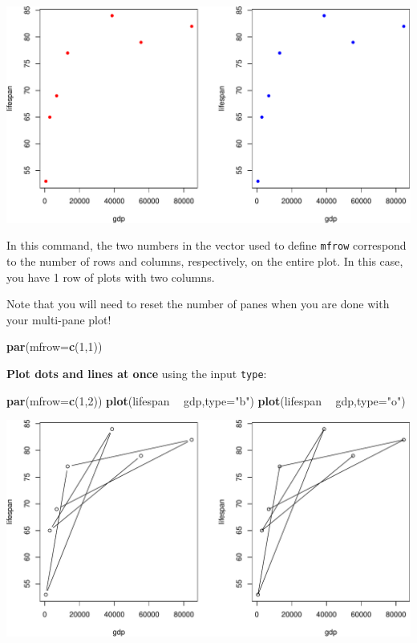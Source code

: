 \documentclass[]{book}
\newenvironment{Shaded}{\begin{snugshade}}{\end{snugshade}}
\newcommand{\DataTypeTok}[1]{\textcolor[rgb]{0.13,0.29,0.53}{#1}}
\newcommand{\DecValTok}[1]{\textcolor[rgb]{0.00,0.00,0.81}{#1}}
\newcommand{\KeywordTok}[1]{\textcolor[rgb]{0.13,0.29,0.53}{\textbf{#1}}}
\newcommand{\NormalTok}[1]{#1}
\newcommand{\OperatorTok}[1]{\textcolor[rgb]{0.81,0.36,0.00}{\textbf{#1}}}
\newcommand{\StringTok}[1]{\textcolor[rgb]{0.31,0.60,0.02}{#1}}
\begin{document}
\includegraphics{figures/unnamed-chunk-236-1.pdf}

In this command, the two numbers in the vector used to define \texttt{mfrow} correspond to the number of rows and columns, respectively, on the entire plot. In this case, you have 1 row of plots with two columns.

Note that you will need to reset the number of panes when you are done with your multi-pane plot!

\begin{Shaded}
\begin{Highlighting}[]
\KeywordTok{par}\NormalTok{(}\DataTypeTok{mfrow=}\KeywordTok{c}\NormalTok{(}\DecValTok{1}\NormalTok{,}\DecValTok{1}\NormalTok{))}
\end{Highlighting}
\end{Shaded}

\textbf{Plot dots and lines at once} using the input \texttt{type}:

\begin{Shaded}
\begin{Highlighting}[]
\KeywordTok{par}\NormalTok{(}\DataTypeTok{mfrow=}\KeywordTok{c}\NormalTok{(}\DecValTok{1}\NormalTok{,}\DecValTok{2}\NormalTok{))}
\KeywordTok{plot}\NormalTok{(lifespan }\OperatorTok{~}\StringTok{ }\NormalTok{gdp,}\DataTypeTok{type=}\StringTok{"b"}\NormalTok{)}
\KeywordTok{plot}\NormalTok{(lifespan }\OperatorTok{~}\StringTok{ }\NormalTok{gdp,}\DataTypeTok{type=}\StringTok{"o"}\NormalTok{)}
\end{Highlighting}
\end{Shaded}

\includegraphics{figures/unnamed-chunk-238-1.pdf}
\end{document}
